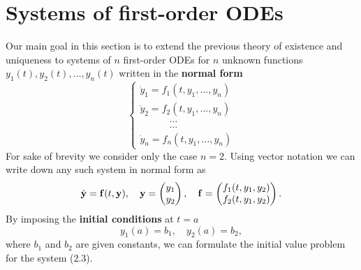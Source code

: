 \documentclass[11pt,a4paper,twoside]{report}
\begin{document}
	\section{Systems of first-order ODEs}
	Our main goal in this section is to extend the previous theory of existence and uniqueness to systems of $n$ first-order ODEs for $n$ unknown functions $y_1(t), y_2(t),\ldots ,y_n(t)$ written in the \textbf{normal form}
	\begin{equation}
		\begin{cases}
			\dot{y}_1 = f_1(t, y_1, \ldots, y_n)\\
			\dot{y}_2 = f_2(t, y_1, \ldots, y_n)\\
			\qquad \quad \ldots\\
			\qquad \quad \ldots\\
			\dot{y}_n = f_n(t, y_1, \ldots, y_n)
		\end{cases}
	\end{equation}
	For sake of brevity we consider only the case $n = 2$. Using vector notation we can write down any such system in normal form as
	\begin{equation}
		\dot{\vb{y}} = \vb{f}(t,\vb{y}),\quad
		\vb{y} =
		\begin{pmatrix}
			y_1\\
			y_2
		\end{pmatrix}, \quad
		\vb{f} = 
		\begin{pmatrix}
			f_1(t,y_1,y_2)\\
			f_2(t,y_1,y_2)
		\end{pmatrix}.
	\end{equation}
	By imposing the \textbf{initial conditions} at $t = a$
	\begin{equation}
		y_1(a) = b_1, \quad
		y_2(a) = b_2,
	\end{equation}
	where $b_1$ and $b_2$ are given constants, we can formulate the initial value problem for the system (2.3).
\end{document}
